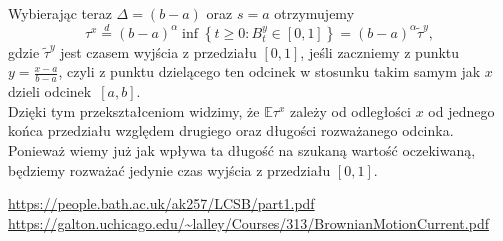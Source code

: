 \documentclass[12pt]{mwrep}
\begin{document}
	Wybierając teraz $\Delta=(b-a)$ oraz $s=a$ otrzymujemy
	\begin{equation}\label{eq:tau_przeskalowane}
		\tau^x\overset{d}{=}(b-a)^\alpha\inf\left\{t\geqslant0:B^y_t\in[0,1]\right\}=(b-a)^\alpha\widetilde\tau^y,
	\end{equation}
	gdzie $\widetilde\tau^y$ jest czasem wyjścia z przedziału $[0, 1]$, jeśli zaczniemy z punktu $y=\frac{x-a}{b-a}$, czyli z punktu dzielącego ten odcinek w stosunku takim samym jak $x$ dzieli odcinek~$[a, b]$.\vspace{1.5mm}\\
	\noindent Dzięki tym przekształceniom widzimy, że $\mathbb{E}\tau^x$ zależy od odległości $x$ od jednego końca przedziału względem drugiego oraz długości rozważanego odcinka. Ponieważ wiemy już jak wpływa ta długość na szukaną wartość oczekiwaną, będziemy rozważać jedynie czas wyjścia z przedziału $[0, 1]$.
	








%	
%	
%	
	
	
	
	
	\newpage
	\begin{thebibliography}{1}
		\url{https://people.bath.ac.uk/ak257/LCSB/part1.pdf}
		\url{https://galton.uchicago.edu/~lalley/Courses/313/BrownianMotionCurrent.pdf}
	\end{thebibliography}
\end{document}
